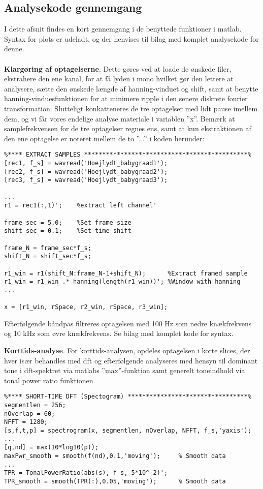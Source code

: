 \subsection{Analysekode gennemgang}
I dette afsnit findes en kort gennemgang i de benyttede funktioner i matlab. Syntax for plots er udeladt, og der henvises til bilag med komplet analysekode for denne. \\
\\
\textbf{Klargøring af optagelserne}. Dette gøres ved at loade de ønskede filer, ekstrahere den ene kanal, for at få lyden i mono hvilket gør den lettere at analysere, sætte den ønskede længde af hanning-vinduet og shift, samt at benytte hanning-vinduesfunktionen for at minimere ripple i den senere diskrete fourier transformation. Slutteligt konkatteneres de tre optagelser med lidt pause imellem dem, og vi får vores endelige analyse materiale i variablen ''x''. Bemærk at samplefrekvensen for de tre optagelser regnes ens, samt at kun ekstraktionen af den ene optagelse er noteret mellem de to ''...'' i koden herunder:
\begin{verbatim}%**** EXTRACT SAMPLES *********************************************%
[rec1, f_s] = wavread('Hoejlydt_babygraad1');
[rec2, f_s] = wavread('Hoejlydt_babygraad2');
[rec3, f_s] = wavread('Hoejlydt_babygraad3');

...
r1 = rec1(:,1)';    %extract left channel'

frame_sec = 5.0;    %Set frame size
shift_sec = 0.1;    %Set time shift

frame_N = frame_sec*f_s;
shift_N = shift_sec*f_s;

r1_win = r1(shift_N:frame_N-1+shift_N);      %Extract framed sample
r1_win = r1_win .* hanning(length(r1_win))'; %Window with hanning
...

x = [r1_win, rSpace, r2_win, rSpace, r3_win];
\end{verbatim}

Efterfølgende båndpas filtreres optagelsen med 100 Hz som nedre knækfrekvens og 10 kHz som øvre knækfrekvens. Se bilag med komplet kode for syntax.

\textbf{Korttids-analyse}. For korttids-analysen, opdeles optagelsen i korte slices, der hver især behandles med dft og efterfølgende analyseres med hensyn til dominant tone i dft-spektret via matlabs ''max''-funktion samt generelt toneindhold via tonal power ratio funktionen.
\begin{verbatim}%**** SHORT-TIME DFT (Spectogram) *********************************%
segmentlen = 256;
nOverlap = 60;
NFFT = 1280;
[s,f,t,p] = spectrogram(x, segmentlen, nOverlap, NFFT, f_s,'yaxis'); 
...
[q,nd] = max(10*log10(p)); 
maxPwr_smooth = smooth(f(nd),0.1,'moving');     % Smooth data
...
TPR = TonalPowerRatio(abs(s), f_s, 5*10^-2)';
TPR_smooth = smooth(TPR(:),0.05,'moving');      % Smooth data
\end{verbatim}

